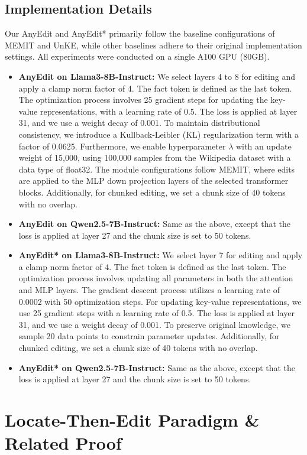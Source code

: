 \subsection{Implementation Details}
Our AnyEdit and AnyEdit* primarily follow the baseline configurations of MEMIT and UnKE, while other baselines adhere to their original implementation settings. All experiments were conducted on a single A100 GPU (80GB).
\begin{itemize}
    \item \textbf{AnyEdit on Llama3-8B-Instruct:} We select layers 4 to 8 for editing and apply a clamp norm factor of 4. The fact token is defined as the last token. The optimization process involves 25 gradient steps for updating the key-value representations, with a learning rate of 0.5. The loss is applied at layer 31, and we use a weight decay of 0.001. To maintain distributional consistency, we introduce a Kullback-Leibler (KL) regularization term with a factor of 0.0625. Furthermore, we enable hyperparameter $\lambda$ with an update weight of 15,000, using 100,000 samples from the Wikipedia dataset with a data type of float32. The module configurations follow MEMIT, where edits are applied to the MLP down projection layers of the selected transformer blocks. Additionally, for chunked editing, we set a chunk size of 40 tokens with no overlap.
    \item \textbf{AnyEdit on Qwen2.5-7B-Instruct:} Same as the above, except that the loss is applied at layer 27 and the chunk size is set to 50 tokens.
    \item \textbf{AnyEdit* on Llama3-8B-Instruct:} We select layer 7 for editing and apply a clamp norm factor of 4. The fact token is defined as the last token. The optimization process involves updating all parameters in both the attention and MLP layers. The gradient descent process utilizes a learning rate of 0.0002 with 50 optimization steps. For updating key-value representations, we use 25 gradient steps with a learning rate of 0.5. The loss is applied at layer 31, and we use a weight decay of 0.001. To preserve original knowledge, we sample 20 data points to constrain parameter updates. Additionally, for chunked editing, we set a chunk size of 40 tokens with no overlap.
    \item \textbf{AnyEdit* on Qwen2.5-7B-Instruct:} Same as the above, except that the loss is applied at layer 27 and the chunk size is set to 50 tokens.
\end{itemize}

\section{Locate-Then-Edit Paradigm \& Related Proof}
